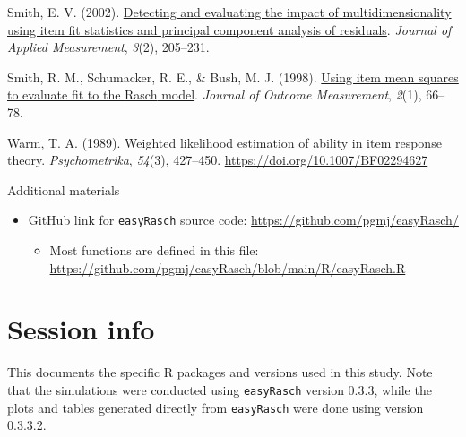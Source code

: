 \documentclass[
  letterpaper,
  DIV=11,
  numbers=noendperiod]{scrartcl}
\providecommand{\tightlist}{%
  \setlength{\itemsep}{0pt}\setlength{\parskip}{0pt}}\usepackage{longtable,booktabs,array}
\newlength{\cslhangindent}
\newenvironment{CSLReferences}[2] %
 {\begin{list}{}{%
  \setlength{\itemindent}{0pt}
  \setlength{\leftmargin}{0pt}
  \setlength{\parsep}{0pt}
  \ifodd #1
   \setlength{\leftmargin}{\cslhangindent}
   \setlength{\itemindent}{-1\cslhangindent}
  \fi
  \setlength{\itemsep}{#2\baselineskip}}}
 {\end{list}}
\begin{document}
\begin{CSLReferences}{1}{0}
Smith, E. V. (2002).
\href{https://www.ncbi.nlm.nih.gov/pubmed/12011501}{Detecting and
evaluating the impact of multidimensionality using item fit statistics
and principal component analysis of residuals}. \emph{Journal of Applied
Measurement}, \emph{3}(2), 205--231.

Smith, R. M., Schumacker, R. E., \& Bush, M. J. (1998).
\href{https://www.ncbi.nlm.nih.gov/pubmed/9661732}{Using item mean
squares to evaluate fit to the {Rasch} model}. \emph{Journal of Outcome
Measurement}, \emph{2}(1), 66--78.

Warm, T. A. (1989). Weighted likelihood estimation of ability in item
response theory. \emph{Psychometrika}, \emph{54}(3), 427--450.
\url{https://doi.org/10.1007/BF02294627}

\end{CSLReferences}

Additional materials

\begin{itemize}
\tightlist
\item
  GitHub link for \texttt{easyRasch} source code:
  \url{https://github.com/pgmj/easyRasch/}

  \begin{itemize}
  \tightlist
  \item
    Most functions are defined in this file:
    \url{https://github.com/pgmj/easyRasch/blob/main/R/easyRasch.R}
  \end{itemize}
\end{itemize}

\section{Session info}\label{session-info}

This documents the specific R packages and versions used in this study.
Note that the simulations were conducted using \texttt{easyRasch}
version 0.3.3, while the plots and tables generated directly from
\texttt{easyRasch} were done using version 0.3.3.2.
\end{document}
